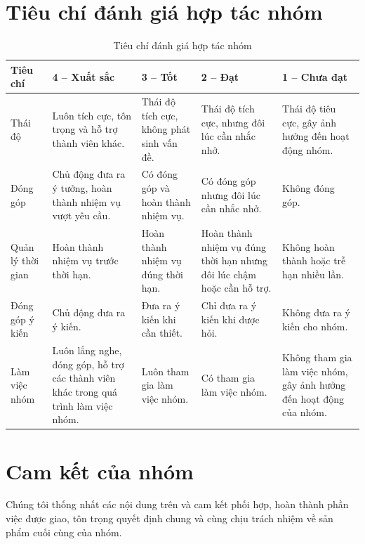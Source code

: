 \documentclass[12pt,a4paper,oneside]{report}
\begin{document}
\section{Tiêu chí đánh giá hợp tác nhóm}\label{sec:tieu_chi}

\begin{table}[H]
\centering
\small
\vspace{-0.8cm}
\caption{Tiêu chí đánh giá hợp tác nhóm}\label{tab:rubric_danh_gia}
\renewcommand{\arraystretch}{1.3}
\begin{tabular}{|>{\raggedright}p{2.2cm}|>{\raggedright\arraybackslash}p{3cm}|>{\raggedright\arraybackslash}p{3cm}|>{\raggedright\arraybackslash}p{3cm}|>{\raggedright\arraybackslash}p{3cm}|}
\hline
\textbf{Tiêu chí} &
\textbf{4 -- Xuất sắc} &
\textbf{3 -- Tốt} &
\textbf{2 -- Đạt} &
\textbf{1 -- Chưa đạt} \\ \hline
Thái độ &
Luôn tích cực, tôn trọng và hỗ trợ thành viên khác. &
Thái độ tích cực, không phát sinh vấn đề. &
Thái độ tích cực, nhưng đôi lúc cần nhắc nhở. &
Thái độ tiêu cực, gây ảnh hưởng đến hoạt động nhóm. \\ \hline
Đóng góp &
Chủ động đưa ra ý tưởng, hoàn thành nhiệm vụ vượt yêu cầu. &
Có đóng góp và hoàn thành nhiệm vụ. &
Có đóng góp nhưng đôi lúc cần nhắc nhở. &
Không đóng góp. \\ \hline
Quản lý thời gian &
Hoàn thành nhiệm vụ trước thời hạn. &
Hoàn thành nhiệm vụ đúng thời hạn. &
Hoàn thành nhiệm vụ đúng thời hạn nhưng đôi lúc chậm hoặc cần hỗ trợ. &
Không hoàn thành hoặc trễ hạn nhiều lần. \\ \hline
Đóng góp ý kiến &
Chủ động đưa ra ý kiến. &
Đưa ra ý kiến khi cần thiết. &
Chỉ đưa ra ý kiến khi được hỏi. &
Không đưa ra ý kiến cho nhóm. \\ \hline
Làm việc nhóm &
Luôn lắng nghe, đóng góp, hỗ trợ các thành viên khác trong quá trình làm việc nhóm. &
Luôn tham gia làm việc nhóm. &
Có tham gia làm việc nhóm. &
Không tham gia làm việc nhóm, gây ảnh hưởng đến hoạt động của nhóm. \\ \hline
\end{tabular}
\end{table}

\section{Cam kết của nhóm}

Chúng tôi thống nhất các nội dung trên và cam kết phối hợp, hoàn thành phần việc được giao, tôn trọng quyết định chung và cùng chịu trách nhiệm về sản phẩm cuối cùng của nhóm.
\end{document}
